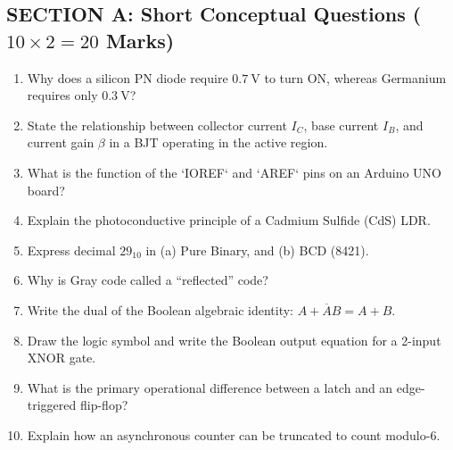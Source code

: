 \subsection*{SECTION A: Short Conceptual Questions ($10 \times 2 = 20$ Marks)}
\begin{enumerate}[label=\textbf{Q\arabic*.}, leftmargin=2em]
    \item Why does a silicon PN diode require $\SI{0.7}{\volt}$ to turn ON, whereas Germanium requires only $\SI{0.3}{\volt}$?
    \item State the relationship between collector current $I_C$, base current $I_B$, and current gain $\beta$ in a BJT operating in the active region.
    \item What is the function of the `IOREF` and `AREF` pins on an Arduino UNO board?
    \item Explain the photoconductive principle of a Cadmium Sulfide (CdS) LDR.
    \item Express decimal $29_{10}$ in (a) Pure Binary, and (b) BCD (8421).
    \item Why is Gray code called a ``reflected'' code?
    \item Write the dual of the Boolean algebraic identity: $A + \overline{A}B = A + B$.
    \item Draw the logic symbol and write the Boolean output equation for a 2-input XNOR gate.
    \item What is the primary operational difference between a latch and an edge-triggered flip-flop?
    \item Explain how an asynchronous counter can be truncated to count modulo-6.
\end{enumerate}

